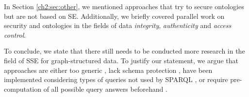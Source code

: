 In Section \ref{ch2:sec:other}, we mentioned approaches that try to secure ontologies but are not based on \gls{SE}. Additionally, we briefly covered parallel work on security and ontologies in the fields of data \emph{integrity}, \emph{authenticity} and \emph{access control}.

To conclude, we state that there still needs to be conducted more research in the field of \gls{SSE} for graph-structured data. To justify our statement, we argue that approaches are either too generic \autocite{Cao2011-is}, lack schema protection \autocite{Nejjahi2019-ig}, have been implemented considering types of queries not used by \gls{SPARQL} \autocite{Suntaxi2021-sj}, or require pre-computation of all possible query answers beforehand \autocite{Poh2012-qs}.



 